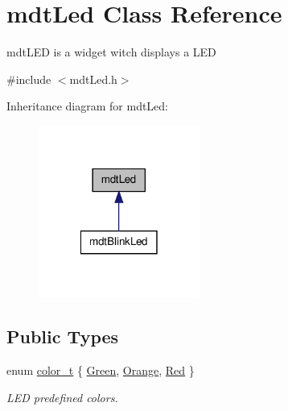 \hypertarget{classmdt_led}{
\section{mdtLed Class Reference}
\label{classmdt_led}
}


mdtLED is a widget witch displays a LED  




{\ttfamily \#include $<$mdtLed.h$>$}



Inheritance diagram for mdtLed:\nopagebreak
\begin{figure}[H]
\begin{center}
\leavevmode
\includegraphics[width=150pt]{classmdt_led__inherit__graph}
\end{center}
\end{figure}
\subsection*{Public Types}
\begin{DoxyCompactItemize}
\item 
enum \hyperlink{classmdt_led_a2d57d9ef04d2105d2fad93b57fc7cfef}{color\_\-t} \{ \hyperlink{classmdt_led_a2d57d9ef04d2105d2fad93b57fc7cfefa45b61a84d67fbd6379dee70b59193415}{Green}, 
\hyperlink{classmdt_led_a2d57d9ef04d2105d2fad93b57fc7cfefa5dc598374ab643ab42ea786bc7fe4a04}{Orange}, 
\hyperlink{classmdt_led_a2d57d9ef04d2105d2fad93b57fc7cfefab889f9da8e6cf657379cb521c3d11406}{Red}
 \}
\begin{DoxyCompactList}\small\item\em LED predefined colors. \end{DoxyCompactList}\end{DoxyCompactItemize}
